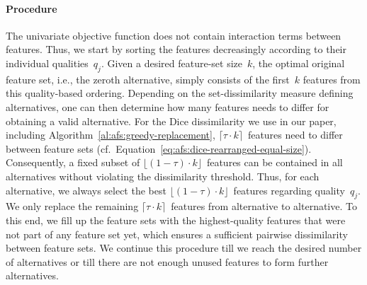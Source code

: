 \documentclass{article}
\theoremstyle{definition}
\begin{document}
\paragraph{Procedure}

The univariate objective function does not contain interaction terms between features.
Thus, we start by sorting the features decreasingly according to their individual qualities~$q_j$.
Given a desired feature-set size~$k$, the optimal original feature set, i.e., the zeroth alternative, simply consists of the first~$k$ features from this quality-based ordering.
Depending on the set-dissimilarity measure defining alternatives, one can then determine how many features needs to differ for obtaining a valid alternative.
For the Dice dissimilarity we use in our paper, including Algorithm~\ref{al:afs:greedy-replacement}, $\lceil \tau \cdot k \rceil$~features need to differ between feature sets (cf.~Equation~\ref{eq:afs:dice-rearranged-equal-size}).
Consequently, a fixed subset of $\lfloor (1 - \tau) \cdot k \rfloor$~features can be contained in all alternatives without violating the dissimilarity threshold.
Thus, for each alternative, we always select the best $\lfloor (1 - \tau) \cdot k \rfloor$~features regarding quality~$q_j$.
We only replace the remaining $\lceil \tau \cdot k \rceil$~features from alternative to alternative.
To this end, we fill up the feature sets with the highest-quality features that were not part of any feature set yet, which ensures a sufficient pairwise dissimilarity between feature sets.
We continue this procedure till we reach the desired number of alternatives or till there are not enough unused features to form further alternatives.
\end{document}
